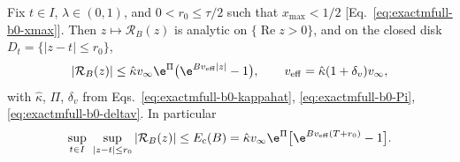 \begin{proposition}
\label{prop:exactmfull-b0-chain}
Fix \(t\in I\), \(\lambda\in(0,1)\), and \(0<r_0\le\tau/2\) such that
\(x_{\max}<1/2\) [Eq.~\eqref{eq:exactmfull-b0-xmax}].  Then
\(z\mapsto\mathcal R_B(z)\) is analytic on
\(\{\operatorname{Re}z>0\}\), and on the closed disk
\(D_t=\{|z-t|\le r_0\}\),
\begin{equation}
 |\mathcal R_B(z)|
 \le\hat\kappa v_\infty\e^{\Pi}
 \bigl(\e^{Bv_{\rm eff}|z|}-1\bigr),
 \qquad
 v_{\rm eff}=\hat\kappa(1+\delta_v)v_\infty,
 \label{eq:exactmfull-b0-remainderbound}
\end{equation}
with \(\hat\kappa\), \(\Pi\), \(\delta_v\) from
Eqs.~\eqref{eq:exactmfull-b0-kappahat}, \eqref{eq:exactmfull-b0-Pi},
\eqref{eq:exactmfull-b0-deltav}.  In particular
\begin{equation}
 \sup_{t\in I}\ \sup_{|z-t|\le r_0}|\mathcal R_B(z)|
 \le E_{\rm c}(B)
 =\hat\kappa v_\infty\e^{\Pi}
 \bigl[\e^{Bv_{\rm eff}(T+r_0)}-1\bigr].
 \label{eq:exactmfull-b0-Ec}
\end{equation}
\end{proposition}

